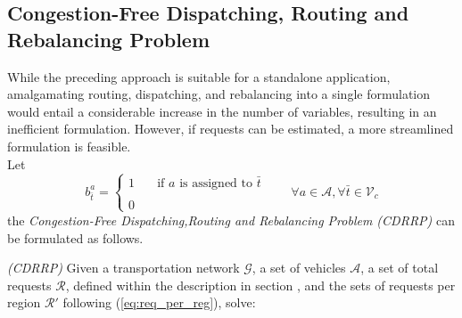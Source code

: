 \subsection{Congestion-Free Dispatching, Routing and Rebalancing Problem}
While the preceding approach is suitable for a standalone application, amalgamating routing, dispatching, and rebalancing into a single formulation would entail a considerable increase in the number of variables, resulting in an inefficient formulation. However, if requests can be estimated, a more streamlined formulation is feasible.\\
Let 
\begin{equation*}
	b_{\bar{t}}^a = 
	\begin{cases} 
		1 & \quad \text{if $a$ is assigned to }\bar{t} \\
		\\
		0
	\end{cases}
	\quad\quad \forall a \in \mathcal{A}, \forall \bar{t} \in \mathcal{V}_c
	\label{eq:assignment}
\end{equation*}
the \textit{Congestion-Free Dispatching,Routing and Rebalancing Problem (CDRRP)} can be formulated as follows. \\
\begin{algori}{\textit{(CDRRP)}}
	Given a transportation network $\mathcal{G}$, a set of vehicles $\mathcal{A}$, a set of total requests $\mathcal{R}$, defined within the description in section ,  and the sets of requests per region $\mathcal{R}'$ following (\ref{eq:req_per_reg}), solve: \\
\end{algori}


